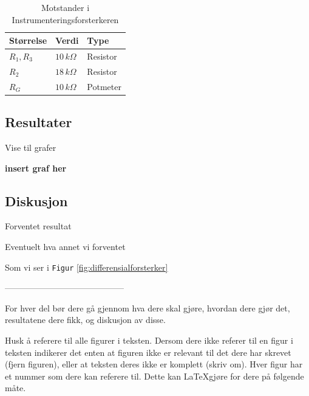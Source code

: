 \begin{table}[h]
	\centering
    \caption{Motstander i Instrumenteringsforsterkeren}
	\begin{tabular}{lll}
		\toprule
		Størrelse & Verdi & Type \\
		\midrule
        $R_1, R_3$ & $10\,k\Omega$& Resistor \\
        $R_2$ & $18\,k\Omega$ & Resistor\\
        $R_G$ & $10\,k\Omega$ & Potmeter\\
		\bottomrule
	\end{tabular}
    
\label{tab:eksempeltabell}
\end{table}

\subsection{Resultater}
Vise til grafer

\textbf{insert graf her}



\subsection{Diskusjon}

Forventet resultat

Eventuelt hva annet vi forventet

Som vi ser i \texttt{Figur} \ref{fig:differensialforsterker}


------------------------------------------


For hver del bør dere gå gjennom hva dere skal gjøre, hvordan dere gjør det, resultatene dere fikk,
og diskusjon av disse. 

Husk å referere til alle figurer i teksten. Dersom dere ikke referer til en 
figur i teksten indikerer det enten at figuren ikke er relevant til det dere
har skrevet (fjern figuren), eller at teksten deres ikke er komplett (skriv om).
Hver figur har et nummer som dere kan referere til. Dette kan \LaTeX gjøre for dere
på følgende måte. 



